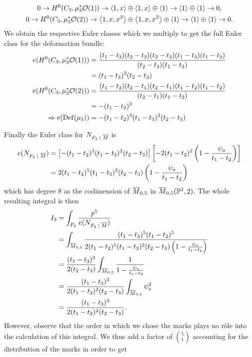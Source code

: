 \documentclass[12pt]{memoir}
\begin{document}
\begin{Ex}
\begin{itemize}
        \begin{gather*}
            0\to H^0(C_3,\mu_3^\ast\mathcal{O}(1))\to\left\langle 1,x\right\rangle\oplus\left\langle 1,x\right\rangle\oplus\left\langle 1\right\rangle\to\left\langle 1\right\rangle\oplus\left\langle 1\right\rangle\to 0,\\
            0\to H^0(C_3,\mu_3^\ast\mathcal{O}(2))\to\left\langle 1,x,x^2\right\rangle\oplus\left\langle 1,x,x^2\right\rangle\oplus\left\langle 1\right\rangle\to\left\langle 1\right\rangle\oplus\left\langle 1\right\rangle\to 0.
        \end{gather*}
        We obtain the respective Euler classes which we multiply to get the full Euler class for the deformation bundle:
        \begin{align*}
        e(H^0(C_3,\mu_3^\ast\mathcal{O}(1)))&=\frac{(t_1-t_3)(t_2-t_3)(t_2-t_3)(t_1-t_3)(t_1-t_3)}{(t_2-t_3)(t_1-t_3)}\\
        &=(t_1-t_3)^2(t_2-t_3)\\
        e(H^0(C_3,\mu_3^\ast\mathcal{O}(2)))&=\frac{(t_1-t_2)(t_2-t_1)(t_2-t_1)(t_1-t_2)(t_1-t_2)}{(t_2-t_1)(t_1-t_2)}\\
        &=-(t_1-t_2)^3\\
        \Rightarrow e(\operatorname{Def}(\mu_3))&=-(t_1-t_2)^3(t_1-t_3)^2(t_2-t_3)
        \end{align*}
    \end{itemize}
    Finally the Euler class for $N_{F_3\mid\ov M}$ is 
    \begin{align*}
        e(N_{F_3\mid\ov M})&=\bonj{-(t_1-t_2)^3(t_1-t_3)^2(t_2-t_3)}\bonj{-2(t_1-t_2)^2\left(1-\frac{\psi_a}{t_1-t_2}\right)}\\
        &=2(t_1-t_2)^5(t_1-t_3)^2(t_2-t_3)\left(1-\frac{\psi_a}{t_1-t_2}\right)
    \end{align*}
    which has degree 8 as the codimension of $\overline M_{0,5}$ in $\overline M_{0,5}(\mathbb{P}^2,2)$. The whole resulting integral is then 
    \begin{align*}
        I_3&=\int_{F_3}\frac{p^5}{e(N_{F_3\mid\ov M})}\\
        &=\int_{\ov M_{0,5}}\frac{(t_1-t_3)^5(t_1-t_2)^5}{2(t_1-t_2)^5(t_1-t_3)^2(t_2-t_3)\left(1-\frac{\psi_a}{t_1-t_2}\right)}\\
        &=\frac{(t_1-t_3)^3}{2(t_2-t_3)}\int_{\ov M_{0,5}}\frac{1}{1-\frac{\psi_a}{t_1-t_2}}\\
        &=\frac{(t_1-t_3)^3}{2(t_1-t_2)^2(t_2-t_3)}\int_{\ov M_{0,5}}\psi_a^2\\
        &=\frac{(t_1-t_3)^3}{2(t_1-t_2)^2(t_2-t_3)}.
    \end{align*}
    However, observe that the order in which we chose the marks plays no r\^ole into the calculation of this integral. We thus add a factor of $\binom{5}{1}$ accounting for the distribution of the marks in order to get 

\end{Ex}
\end{document}
